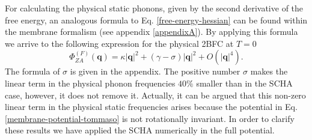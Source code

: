 For calculating the physical static phonons, given by the second derivative of the free energy, an analogous formula 
to Eq. \ref{free-energy-hessian} can be found within the membrane formalism (see appendix \ref{appendixA}). By 
applying this formula we arrive to the following expression for the physical 2BFC at $T=0$
\begin{equation}
 \Phi_{ZA}^{(F)}(\boldsymbol{q})=\kappa|\boldsymbol{q}|^{2}+(\gamma-\sigma)|\boldsymbol{q}|^{2}+
 O(|\boldsymbol{q}|^{4}).
\end{equation} 
The formula of $\sigma$ is given in the appendix. The positive number $\sigma$ makes the linear term in the physical 
phonon frequencies $40\%$ smaller than in the SCHA case, however, it does not remove it. Actually, it can be argued 
that this non-zero linear term in the physical static frequencies arises because the potential in 
Eq. \ref{membrane-potential-tommaso} is not rotationally invariant. In order to clarify these results we have 
applied the SCHA numerically in the full potential. \\

